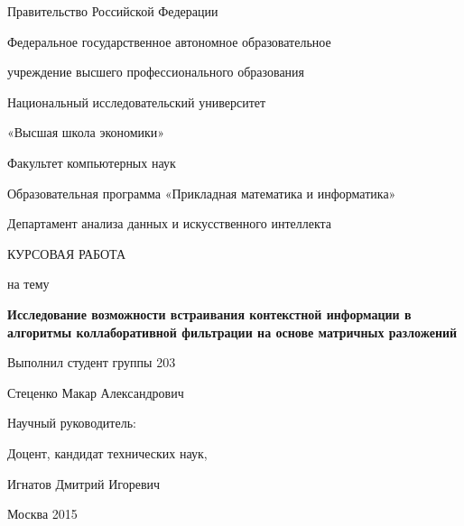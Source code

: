 \thispagestyle{empty}

\begin{center}
{\large Правительство Российской Федерации\par
Федеральное государственное автономное образовательное\par
учреждение высшего профессионального образования\par}
{\Large Национальный исследовательский университет\par
«Высшая школа экономики»\par}
\end{center}

\vspace{5mm}

\begin{center}
{\large Факультет компьютерных наук\par
Образовательная программа «Прикладная математика и информатика»\par 
Департамент анализа данных и искусственного интеллекта\par
\par}
\end{center}

\vspace{30mm}

\begin{center}
{\Large КУРСОВАЯ РАБОТА}\par
{\large на тему\par}
\textbf{\Large Исследование возможности встраивания контекстной информации в алгоритмы коллаборативной фильтрации на основе матричных разложений}
\end{center}

\vspace{30mm}
\begin{flushright}
{\large Выполнил студент группы 203\par
Стеценко Макар Александрович\par
\par
\vspace{5mm}
Научный руководитель:\par
Доцент, кандидат технических наук,\par Игнатов Дмитрий Игоревич\par}
\end{flushright}

\vspace{30mm}
\begin{center}
{\large Москва 2015}
\end{center}

\newpage